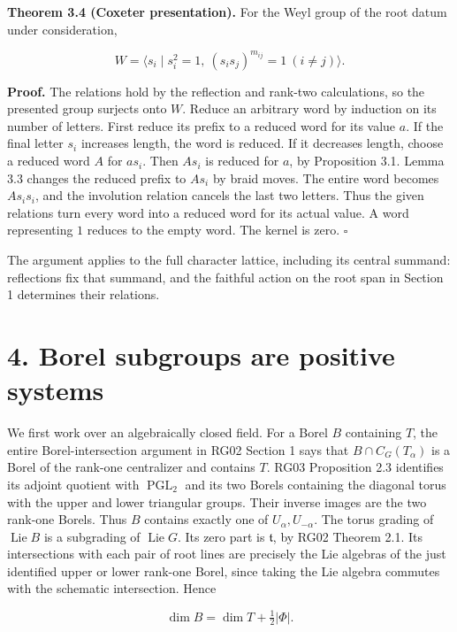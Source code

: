 \documentclass[11pt,a4paper,openany]{report}
\begin{document}
\textbf{Theorem 3.4 (Coxeter presentation).} For the Weyl group of the root datum under consideration,

\[
W=\langle s_i\mid s_i^2=1,\ (s_i s_j)^{m_{ij}}=1\ (i\ne j)\rangle.
\]

\textbf{Proof.} The relations hold by the reflection and rank-two calculations, so the presented group surjects onto \(W\). Reduce an arbitrary word by induction on its number of letters. First reduce its prefix to a reduced word for its value \(a\). If the final letter \(s_i\) increases length, the word is reduced. If it decreases length, choose a reduced word \(A\) for \(as_i\). Then \(A s_i\) is reduced for \(a\), by Proposition 3.1. Lemma 3.3 changes the reduced prefix to \(A s_i\) by braid moves. The entire word becomes \(A s_i s_i\), and the involution relation cancels the last two letters. Thus the given relations turn every word into a reduced word for its actual value. A word representing \(1\) reduces to the empty word. The kernel is zero. \(\square\)

The argument applies to the full character lattice, including its central summand: reflections fix that summand, and the faithful action on the root span in Section 1 determines their relations.

\section{4. Borel subgroups are positive systems}\label{AG-RG-04-borel-subgroups-are-positive-systems}

We first work over an algebraically closed field. For a Borel \(B\) containing \(T\), the entire Borel-intersection argument in RG02 Section 1 says that \(B\cap C_G(T_\alpha)\) is a Borel of the rank-one centralizer and contains \(T\). RG03 Proposition 2.3 identifies its adjoint quotient with \(\operatorname{PGL}_2\) and its two Borels containing the diagonal torus with the upper and lower triangular groups. Their inverse images are the two rank-one Borels. Thus \(B\) contains exactly one of \(U_\alpha,U_{-\alpha}\). The torus grading of \(\operatorname{Lie}B\) is a subgrading of \(\operatorname{Lie}G\). Its zero part is \(\mathfrak t\), by RG02 Theorem 2.1. Its intersections with each pair of root lines are precisely the Lie algebras of the just identified upper or lower rank-one Borel, since taking the Lie algebra commutes with the schematic intersection. Hence

\[
\dim B=\dim T+\tfrac12|\Phi|.
\tag{4.1}
\]
\end{document}

